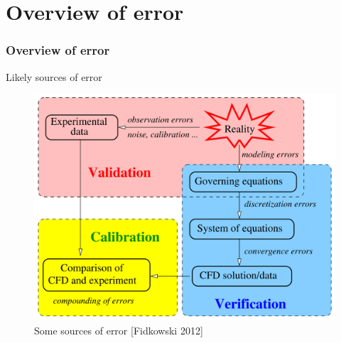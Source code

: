 \documentclass{beamer}
\begin{document}


\section[Error]{Overview of error}
\begin{frame}%
\frametitle{Overview of error}
\vspace{0pt}
\begin{minipage}[t][1\textheight]{1\textwidth}
\scriptsize
\vspace{-20pt}
\begin{exampleblock}{Likely sources of error}
\vspace{-10pt}
\begin{figure}[h!]
\includegraphics[height=0.64\textwidth]{./figs/Error.png}
\vspace{-5pt}
\caption{Some sources of error [Fidkowski 2012]}
\label{fig:Fidk}
\end{figure}
\vspace{-20pt}
\end{exampleblock}
\end{minipage}
\end{frame}
\end{document}
